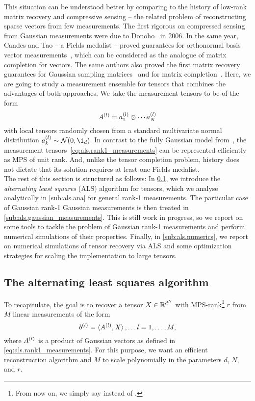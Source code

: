 This situation can be understood better by comparing to the history of low-rank matrix recovery and compressive sensing -- the related problem of reconstructing sparse vectors from few measurements.
The first rigorous on compressed sensing from Gaussian measurements were due to Donoho~\cite{For_most} in 2006.
In the same year, Candes and Tao -- a Fields medalist -- proved guarantees for orthonormal basis vector measurements~\cite{Stable_signal}, which can be considered as the analogue of matrix completion for vectors.
The same authors also proved the first matrix recovery guarantees for Gaussian sampling matrices~\cite{} and for matrix completion~\cite{}.
Here, we are going to study a measurement ensemble for tensors that combines the advantages of both approaches.
We take the measurement tensors to be of the form
\[
  A^{(l)} = a^{(l)}_1 \otimes \cdots a^{(l)}_N
  \label{eq:als.rank1_measurements}
\]
with local tensors randomly chosen from a standard multivariate normal distribution $a\ind{l}_k \sim \Normal(0, \1_d)$.
In contrast to the fully Gaussian model from~\cite{}, the measurement tensors~\eqref{eq:als.rank1_measurements} can be represented efficiently as MPS of unit rank.
And, unlike the tensor completion problem, history does not dictate that its solution requires at least one Fields medalist.\\



The rest of this section is structured as follows:
In \cref{sub:als.algorithm}, we introduce the \emph{alternating least squares} (ALS) algorithm for tensors, which we analyse analytically in \cref{sub:als.ana} for general rank-1 measurements.
The particular case of Gaussian rank-1 Gaussian measurements is then treated in \cref{sub:als.gaussian_measurements}.
This is still work in progress, so we report on some tools to tackle the problem of Gaussian rank-1 measurements and perform numerical simulations of their properties.
Finally, in \cref{sub:als.numerics}, we report on numerical simulations of tensor recovery via ALS and some optimization strategies for scaling the implementation to large tensors.



\subsection{The alternating least squares algorithm}%
\label{sub:als.algorithm}

To recapitulate, the goal is to recover a tensor $X \in {\mathbb{R}}^{d^N}$ with MPS-rank\footnote{%
  From now on, we simply say  instead of .
} $r$ from $M$ linear measurements of the form
\[
  b^{(l)} = \braket{A^{(l)}, X}, \ldots l=1,\ldots,M,
\]
where $A^{(l)}$ is a product of Gaussian vectors as defined in \cref{eq:als.rank1_measurements}.
For this purpose, we want an efficient reconstruction algorithm and $M$ to scale polynomially in the parameters $d$, $N$, and $r$.

